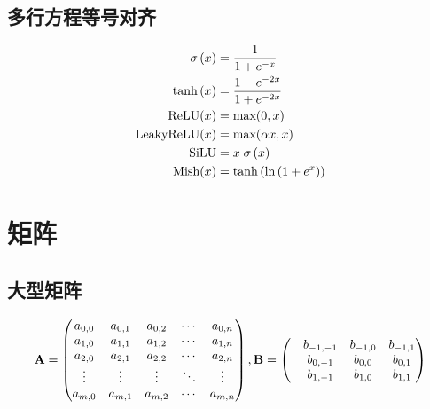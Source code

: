 \subsection{多行方程等号对齐}

\begin{align}
    \sigma\left(x\right) &= \frac{1}{1+e^{-x}} \label{acti:sigmoid} \\
    \tanh \left(x\right) &= \frac{1-e^{-2x}}{1+e^{-2x}} \label{acti:tanh} \\
    \text{ReLU}(x) &= \text{max}(0, x) \label{acti:relu} \\
    \text{LeakyReLU}(x) &= \text{max}(\alpha x, x) \label{acti:leaky_relu} \\
    \text{SiLU} &= x \; \sigma\left(x\right) \label{acti:silu} \\
    \text{Mish}(x) &=  \tanh \left(\ln \left(1+e^x\right) \right) \label{acti:mish}  
\end{align}

\section{矩阵}

\subsection{大型矩阵}

\begin{equation}
    \mathbf{A}=
    \left(
        \begin{matrix}
            a_{0,0} & a_{0,1} & a_{0,2} & \cdots & a_{0,n} \\
            a_{1,0} & a_{1,1} & a_{1,2} & \cdots & a_{1,n} \\
            a_{2,0} & a_{2,1} & a_{2,2} & \cdots & a_{2,n} \\
            \vdots & \vdots & \vdots & \ddots & \vdots \\
            a_{m,0} & a_{m,1} & a_{m,2} & \cdots & a_{m,n}
        \end{matrix}
    \right), \mathbf{B}=
    \left(
        \begin{matrix}
             & b_{-1,-1} & b_{-1,0} & b_{-1,1} \\
             & b_{0,-1} & b_{0,0} & b_{0,1} \\
             & b_{1,-1} & b_{1,0} & b_{1,1}
        \end{matrix}
    \right)
\end{equation}

